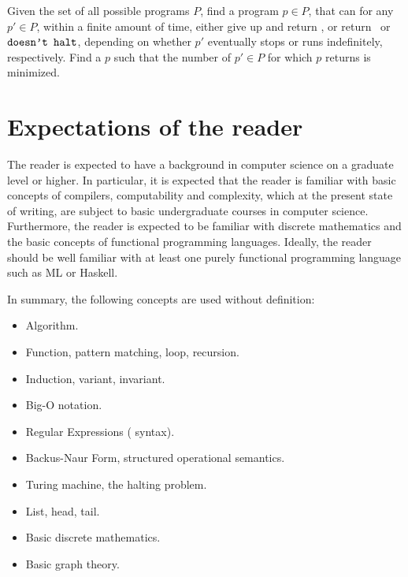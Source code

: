 \begin{definition} Given the set of all possible programs $P$, find a program
$p\in P$, that can for any $p'\in P$, within a finite amount of time, either
give up and return , or return \ or
$\text{{\ttfamily doesn't halt}}$, depending on whether $p'$ eventually stops or
runs indefinitely, respectively. Find a $p$ such that the number of $p'\in P$
for which $p$ returns  is minimized.\end{definition}

\section{Expectations of the reader}

The reader is expected to have a background in computer science on a graduate
level or higher. In particular, it is expected that the reader is familiar with
basic concepts of compilers, computability and complexity, which at the present
state of writing, are subject to basic undergraduate courses in computer
science. Furthermore, the reader is expected to be familiar with discrete
mathematics and the basic concepts of functional programming languages.
Ideally, the reader should be well familiar with at least one purely functional
programming language such as ML or Haskell.

In summary, the following concepts are used without definition:

\begin{itemize}

\item Algorithm.

\item Function, pattern matching, loop, recursion.

\item Induction, variant, invariant.

\item Big-O notation.

\item Regular Expressions ( syntax).

\item Backus-Naur Form, structured operational semantics.

\item Turing machine, the halting problem.

\item List, head, tail.

\item Basic discrete mathematics.

\item Basic graph theory.

\end{itemize}

